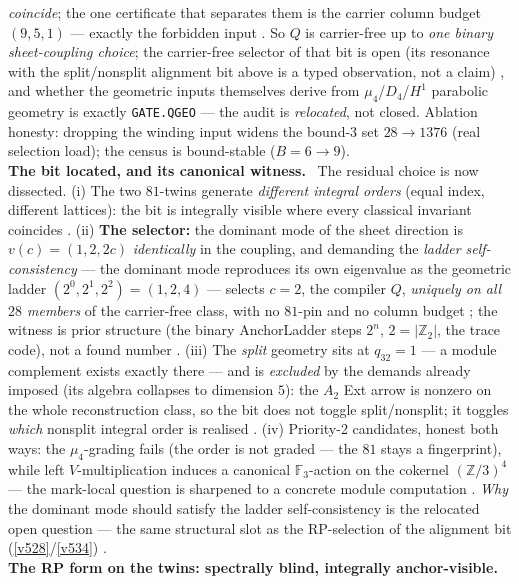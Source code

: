 \documentclass[11pt,a4paper]{article}
\newcommand{\Z}{\mathbb{Z}}
\theoremstyle{definition}
\begin{document}
\begin{winbox}
\emph{coincide}; the one certificate that separates them is the carrier column budget $(9,5,1)$ ---
exactly the forbidden input \mE.  So $Q$ is carrier-free up to \emph{one binary sheet-coupling
choice}; the carrier-free selector of that bit is open (its resonance with the split/nonsplit
alignment bit above is a typed observation, not a claim) \mO, and whether the geometric inputs
themselves derive from $\mu_4$/$D_4$/$H^1$ parabolic geometry is exactly \texttt{GATE.QGEO} ---
the audit is \emph{relocated}, not closed.  Ablation honesty: dropping the winding input widens
the bound-$3$ set $28\to1376$ (real selection load); the census is bound-stable ($B=6\to9$).
\smallskip\\
\noindent\textbf{The bit located, and its canonical witness.}
\ The residual choice is now dissected.  (i) The two
$81$-twins generate \emph{different integral orders} (equal index, different lattices): the bit
is integrally visible where every classical invariant coincides \mE.  (ii) \textbf{The
selector:} the dominant mode of the sheet direction is $v(c)=(1,2,2c)$ \emph{identically} in the
coupling, and demanding the \emph{ladder self-consistency} --- the dominant mode reproduces its
own eigenvalue as the geometric ladder $(2^0,2^1,2^2)=(1,2,4)$ --- selects $c=2$, the compiler
$Q$, \emph{uniquely on all $28$ members} of the carrier-free class, with no $81$-pin and no
column budget \mE; the witness is prior structure (the binary AnchorLadder steps $2^n$,
$2=|\Z_2|$, the trace code), not a found number \mC.  (iii) The \emph{split} geometry sits at
$q_{32}=1$ --- a module complement exists exactly there --- and is \emph{excluded} by the
demands already imposed (its algebra collapses to dimension $5$): the $A_2$ Ext arrow is
nonzero on the whole reconstruction class, so the bit does not toggle split/nonsplit; it
toggles \emph{which} nonsplit integral order is realised \mE.  (iv) Priority-2 candidates,
honest both ways: the $\mu_4$-grading fails (the order is not graded --- the $81$ stays a
fingerprint), while left $V$-multiplication induces a canonical $\mathbb F_3$-action on the
cokernel $(\Z/3)^4$ --- the mark-local question is sharpened to a concrete module computation
\mO.  \emph{Why} the dominant mode should satisfy the ladder self-consistency is the relocated
open question --- the same structural slot as the RP-selection of the alignment bit
(\vref{v528}/\vref{v534}) \mO.
\smallskip\\
\noindent\textbf{The RP form on the twins: spectrally blind, integrally anchor-visible.}

\end{winbox}
\end{document}
